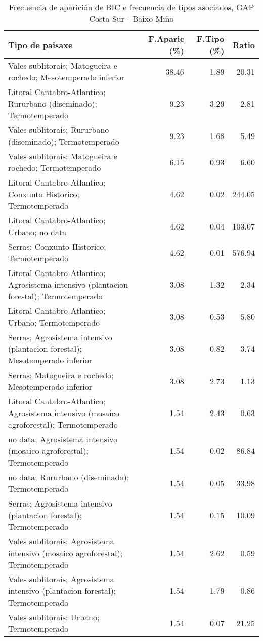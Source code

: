 \begin{table}[p]
\centering
\caption{Frecuencia de aparición de BIC e frecuencia de tipos asociados, GAP Costa Sur - Baixo Miño} 
\label{vbic3}
\begin{tabular}{lrrr}
  \hline
Tipo de paisaxe & F.Aparic (\%) & F.Tipo (\%) & Ratio \\ 
  \hline
Vales sublitorais; Matogueira e rochedo; Mesotemperado inferior & 38.46 & 1.89 & 20.31 \\ 
  Litoral Cantabro-Atlantico; Rururbano (diseminado); Termotemperado & 9.23 & 3.29 & 2.81 \\ 
  Vales sublitorais; Rururbano (diseminado); Termotemperado & 9.23 & 1.68 & 5.49 \\ 
  Vales sublitorais; Matogueira e rochedo; Termotemperado & 6.15 & 0.93 & 6.60 \\ 
  Litoral Cantabro-Atlantico; Conxunto Historico; Termotemperado & 4.62 & 0.02 & 244.05 \\ 
  Litoral Cantabro-Atlantico; Urbano; no data & 4.62 & 0.04 & 103.07 \\ 
  Serras; Conxunto Historico; Termotemperado & 4.62 & 0.01 & 576.94 \\ 
  Litoral Cantabro-Atlantico; Agrosistema intensivo (plantacion forestal); Termotemperado & 3.08 & 1.32 & 2.34 \\ 
  Litoral Cantabro-Atlantico; Urbano; Termotemperado & 3.08 & 0.53 & 5.80 \\ 
  Serras; Agrosistema intensivo (plantacion forestal); Mesotemperado inferior & 3.08 & 0.82 & 3.74 \\ 
  Serras; Matogueira e rochedo; Mesotemperado inferior & 3.08 & 2.73 & 1.13 \\ 
  Litoral Cantabro-Atlantico; Agrosistema intensivo (mosaico agroforestal); Termotemperado & 1.54 & 2.43 & 0.63 \\ 
  no data; Agrosistema intensivo (mosaico agroforestal); Termotemperado & 1.54 & 0.02 & 86.84 \\ 
  no data; Rururbano (diseminado); Termotemperado & 1.54 & 0.05 & 33.98 \\ 
  Serras; Agrosistema intensivo (plantacion forestal); Termotemperado & 1.54 & 0.15 & 10.09 \\ 
  Vales sublitorais; Agrosistema intensivo (mosaico agroforestal); Termotemperado & 1.54 & 2.62 & 0.59 \\ 
  Vales sublitorais; Agrosistema intensivo (plantacion forestal); Termotemperado & 1.54 & 1.79 & 0.86 \\ 
  Vales sublitorais; Urbano; Termotemperado & 1.54 & 0.07 & 21.25 \\ 
   \hline
\end{tabular}
\end{table}
